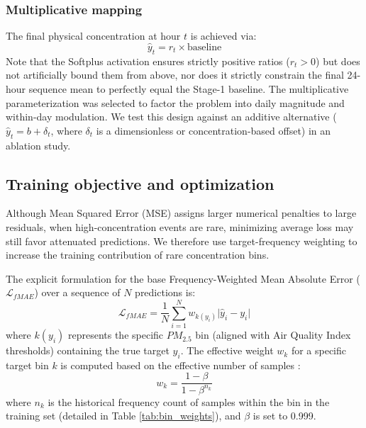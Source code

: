 \subsubsection{Multiplicative mapping}
The final physical concentration at hour $t$ is achieved via:
\begin{equation}
    \hat{y}_t = r_t \times \text{baseline}
\end{equation}
Note that the Softplus activation ensures strictly positive ratios ($r_t > 0$) but does not artificially bound them from above, nor does it strictly constrain the final 24-hour sequence mean to perfectly equal the Stage-1 baseline. The multiplicative parameterization was selected to factor the problem into daily magnitude and within-day modulation. We test this design against an additive alternative ($\hat{y}_t = b + \delta_t$, where $\delta_t$ is a dimensionless or concentration-based offset) in an ablation study.

\subsection{Training objective and optimization}
Although Mean Squared Error (MSE) assigns larger numerical penalties to large residuals, when high-concentration events are rare, minimizing average loss may still favor attenuated predictions. We therefore use target-frequency weighting to increase the training contribution of rare concentration bins.

The explicit formulation for the base Frequency-Weighted Mean Absolute Error ($\mathcal{L}_{fMAE}$) over a sequence of $N$ predictions is:
\begin{equation}
    \mathcal{L}_{fMAE} = \frac{1}{N} \sum_{i=1}^{N} w_{k(y_i)} \Big| \hat{y}_i - y_i \Big|
\end{equation}
where $k(y_i)$ represents the specific $PM_{2.5}$ bin (aligned with Air Quality Index thresholds) containing the true target $y_i$. The effective weight $w_k$ for a specific target bin $k$ is computed based on the effective number of samples \cite{kim2023effective}:
\begin{equation}
    w_k = \frac{1 - \beta}{1 - \beta^{n_k}}
\end{equation}
where $n_k$ is the historical frequency count of samples within the bin in the training set (detailed in Table \ref{tab:bin_weights}), and $\beta$ is set to 0.999.

